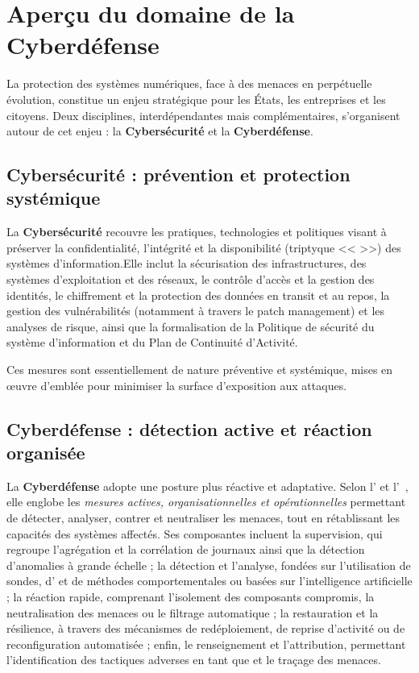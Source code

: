 \section{Aperçu du domaine de la Cyberdéfense}\label{sec:cyberdef-panorama}

La protection des systèmes numériques, face à des menaces en perpétuelle évolution, constitue un enjeu stratégique pour les États, les entreprises et les citoyens. Deux disciplines, interdépendantes mais complémentaires, s'organisent autour de cet enjeu : la \textbf{Cybersécurité} et la \textbf{Cyberdéfense}.

\subsection*{Cybersécurité : prévention et protection systémique}

La \textbf{Cybersécurité} recouvre les pratiques, technologies et politiques visant à préserver la confidentialité, l'intégrité et la disponibilité (triptyque <<  >>) des systèmes d'information.Elle inclut la sécurisation des infrastructures, des systèmes d'exploitation et des réseaux, le contrôle d'accès et la gestion des identités, le chiffrement et la protection des données en transit et au repos, la gestion des vulnérabilités (notamment à travers le patch management) et les analyses de risque, ainsi que la formalisation de la Politique de sécurité du système d'information et du Plan de Continuité d'Activité.

Ces mesures sont essentiellement de nature préventive et systémique, mises en œuvre d'emblée pour minimiser la surface d'exposition aux attaques.

\subsection*{Cyberdéfense : détection active et réaction organisée}

La \textbf{Cyberdéfense} adopte une posture plus réactive et adaptative. Selon l' et l'~\cite{ANSSI2024,NATO2016Cyberdef}, elle englobe les \emph{mesures actives, organisationnelles et opérationnelles} permettant de détecter, analyser, contrer et neutraliser les menaces, tout en rétablissant les capacités des systèmes affectés. Ses composantes incluent la supervision, qui regroupe l'agrégation et la corrélation de journaux ainsi que la détection d'anomalies à grande échelle ; la détection et l'analyse, fondées sur l'utilisation de sondes, d' et de méthodes comportementales ou basées sur l'intelligence artificielle ; la réaction rapide, comprenant l'isolement des composants compromis, la neutralisation des menaces ou le filtrage automatique ; la restauration et la résilience, à travers des mécanismes de redéploiement, de reprise d'activité ou de reconfiguration automatisée ; enfin, le renseignement et l'attribution, permettant l'identification des tactiques adverses en tant que  et le traçage des menaces.

